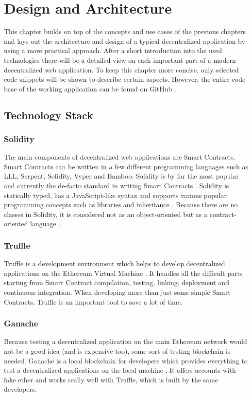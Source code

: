 \chapter{Design and Architecture}
\label{cha:DesignArchitecture}

This chapter builds on top of the concepts and use cases of the previous chapters and lays out the architecture and design of a typical decentralized application by using a more practical approach. After a short introduction into the used technologies there will be a detailed view on each important part of a modern decentralized web application. To keep this chapter more concise, only selected code snippets will be shown to describe certain aspects. However, the entire code base of the working application can be found on GitHub \cite{CherryPool}.

\section{Technology Stack}
\subsection{Solidity}
The main components of decentralized web applications are Smart Contracts. Smart Contracts can be written in a few different programming languages such as LLL, Serpent, Solidity, Vyper and Bamboo. Solidity is by far the most popular and currently the de-facto standard in writing Smart Contracts \cite{AntonopoulosWood2018}. Solidity is statically typed, has a JavaScript-like syntax and supports various popular programming concepts such as libraries and inheritance \cite{SolidityDocumentation}. Because there are no classes in Solidity, it is considered not as an object-oriented but as a contract-oriented language \cite{Solidity}.

\subsection{Truffle}
Truffle is a development environment which helps to develop decentralized applications on the Ethereum Virtual Machine \cite{Truffle}. It handles all the difficult parts starting from Smart Contract compilation, testing, linking, deployment and continuous integration. When developing more than just some simple Smart Contracts, Truffle is an important tool to save a lot of time.

\subsection{Ganache}
Because testing a decentralized application on the main Ethereum network would not be a good idea (and is expensive too), some sort of testing blockchain is needed. Ganache is a local blockchain for developers which provides everything to test a decentralized applications on the local machine \cite{Ganache}. It offers accounts with fake ether and works really well with Truffle, which is built by the same developers.

